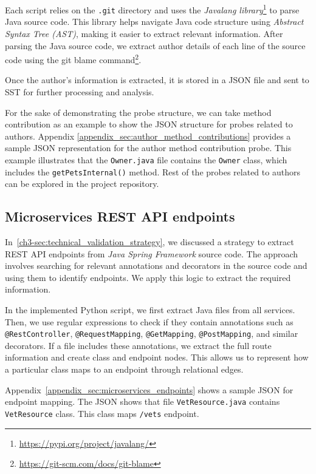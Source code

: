 Each script relies on the \texttt{.git} directory and uses the \textit{Javalang library}\footnote{\url{https://pypi.org/project/javalang/}} to parse Java source code. This library helps navigate Java code structure using \textit{Abstract Syntax Tree (AST)}, making it easier to extract relevant information. After parsing the Java source code, we extract author details of each line of the source code using the git blame command\footnote{\url{https://git-scm.com/docs/git-blame}}.

Once the author's information is extracted, it is stored in a JSON file and sent to SST for further processing and analysis.

For the sake of demonstrating the probe structure, we can take method contribution as an example to show the JSON structure for probes related to authors. Appendix \ref{appendix_sec:author_method_contributions} provides a sample JSON representation for the author method contribution probe. This example illustrates that the \texttt{Owner.java} file contains the \texttt{Owner} class, which includes the \texttt{getPetsInternal()} method. Rest of the probes related to authors can be explored in the project repository.

\subsection{Microservices REST API endpoints}

In~\autoref{ch3-sec:technical_validation_strategy}, we discussed a strategy to extract REST API endpoints from \textit{Java Spring Framework} source code. The approach involves searching for relevant annotations and decorators in the source code and using them to identify endpoints. We apply this logic to extract the required information.  

\sloppy
In the implemented Python script, we first extract Java files from all services. Then, we use regular expressions to check if they contain annotations such as \texttt{@RestController}, \texttt{@RequestMapping}, \texttt{@GetMapping}, \texttt{@PostMapping}, and similar decorators. If a file includes these annotations, we extract the full route information and create class and endpoint nodes. This allows us to represent how a particular class maps to an endpoint through relational edges.

Appendix~\ref{appendix_sec:microservices_endpoints} shows a sample JSON for endpoint mapping. The JSON shows that file \texttt{VetResource.java} contains \texttt{VetResource} class. This class maps \texttt{/vets} endpoint.

